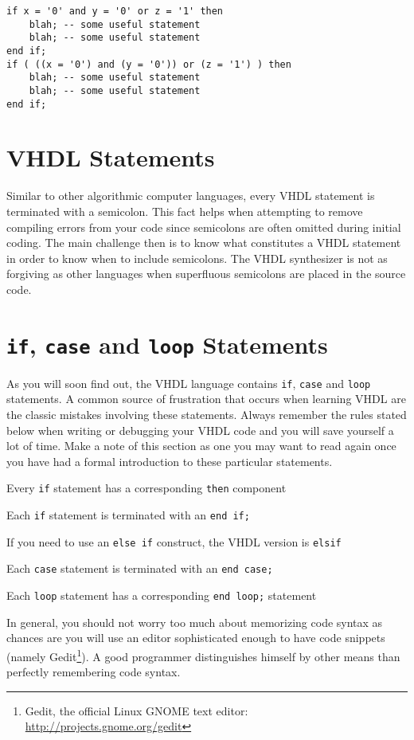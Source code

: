 \noindent
\begin{minipage}{0.99\linewidth}
\begin{lstlisting}[label=parenthesis, caption=Example of parentheses that can improve clarity.]
if x = '0' and y = '0' or z = '1' then
	blah; -- some useful statement
	blah; -- some useful statement
end if;
if ( ((x = '0') and (y = '0')) or (z = '1') ) then
	blah; -- some useful statement
	blah; -- some useful statement
end if;
\end{lstlisting}
\end{minipage}

\section{VHDL Statements}
Similar to other algorithmic computer languages, every VHDL statement is terminated with a semicolon. This fact helps when attempting to remove compiling errors from your code since semicolons are often omitted during initial coding. The main challenge then is to know what constitutes a VHDL statement in order to know when to include semicolons. The VHDL synthesizer is not as forgiving as other languages when superfluous semicolons are placed in the source code.

\section{\texttt{if}, \texttt{case} and \texttt{loop} Statements}
As you will soon find out, the VHDL language contains \texttt{if}, \texttt{case} and \texttt{loop} statements. A common source of frustration that occurs when learning VHDL are the classic mistakes involving these statements. Always remember the rules stated below when writing or debugging your VHDL code and you will save yourself a lot of time. Make a note of this section as one you may want to read again once you have had a formal introduction to these particular statements.
\begin{my_list}
\item Every \texttt{if} statement has a corresponding \texttt{then} component
\item Each \texttt{if} statement is terminated with an \texttt{end if;}
\item If you need to use an \texttt{else if} construct, the VHDL version is \texttt{elsif}
\item Each \texttt{case} statement is terminated with an \texttt{end case;}
\item Each \texttt{loop} statement has a corresponding \texttt{end loop;} statement
\end{my_list}
In general, you should not worry too much about memorizing code syntax as chances are you will use an editor sophisticated enough to have code snippets (namely Gedit\footnote{Gedit, the official Linux GNOME text editor: {\scriptsize\url{http://projects.gnome.org/gedit}}}). A good programmer distinguishes himself by other means than perfectly remembering code syntax.

